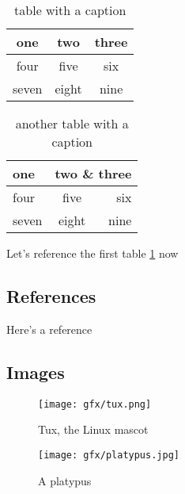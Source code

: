\begin{table}[htpb]
	\begin{tabular}{|c||cc|}
		\hline
		one & two & three \\
		\hline\hline
		four & five & six\\
		seven & eight & nine\\
		\hline
	\end{tabular}
	\caption{table with a caption}
	\label{lTable1}
\end{table}

\begin{table}[htpb]
	\begin{tabular}{|l|c|r|}
		\hline
		one & \multicolumn{2}{c|}{two \& three} \\
		\hline
		four & five & six\\
		seven & eight & nine\\
		\hline
	\end{tabular}
	\caption{another table with a caption}
\end{table}

Let's reference the first table \ref{lTable1} now

\subsection{References}
Here's a reference \cite{liu01smart}

\subsection{Images}
\begin{figure}[htb]
	\centering
	\texttt{[image: gfx/tux.png]}
	\caption{Tux, the Linux mascot}
\end{figure}

\begin{figure}[htb]
	\centering
	\texttt{[image: gfx/platypus.jpg]}
	\caption{A platypus}
\end{figure}

